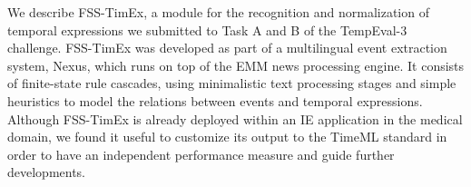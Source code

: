 We describe FSS-TimEx, a module for the recognition and normalization of temporal expressions we submitted to Task A and B of the TempEval-3 challenge.
 FSS-TimEx was developed as part of a multilingual event extraction system,
 Nexus, which runs on top of the EMM news processing engine. It consists of
 finite-state rule cascades, using minimalistic text processing stages and
 simple heuristics
 to model the relations between events and temporal expressions. Although
 FSS-TimEx
 is already deployed within an IE application in the medical domain, we found it
 useful to customize its output to the TimeML standard in order to have an
 independent performance measure and guide further developments.

